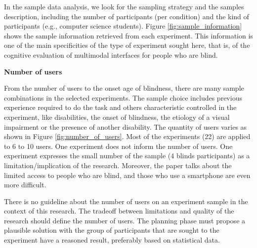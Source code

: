 In the sample data analysis, we look for the sampling strategy and the samples description, including the number of participants (per condition) and the kind of participants (e.g., computer science students). Figure \ref{fig:sample_information} shows the sample information retrieved from each experiment. This information is one of the main specificities of the type of experiment sought here, that is, of the cognitive evaluation of multimodal interfaces for people who are blind.
	\begin{figure}[h] 
       \captionsetup{width=15cm}%
	\end{figure}


\textbf{Number of users}

From the number of users to the onset age of blindness, there are many sample combinations in the selected experiments. The sample choice includes previous experience required to do the task and others characteristic controlled in the experiment, like disabilities, the onset of blindness, the etiology of a visual impairment or the presence of another disability. The quantity of users varies as shown in Figure \ref{fig:number_of_users}. Most of the experiments (22) are applied to 6 to 10 users. One experiment does not inform the number of users. One experiment \cite{Hossain2011} expresses the small number of the sample (4 blinds participants) as a limitation/implication of the research. Moreover, the paper talks about the limited access to people who are blind, and those who use a smartphone are even more difficult.

There is no guideline about the number of users on an experiment sample in the context of this research. The tradeoff between limitations and quality of the research should define the number of users. The planning phase must propose a plausible solution with the group of participants that are sought to the experiment have a reasoned result, preferably based on statistical data.

